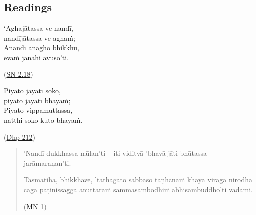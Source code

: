 \documentclass[11pt,oneside]{memoir}
\begin{document}
\normalArrayStretch

\clearpage
\subsection{Readings}
\label{sec:org4e81f1f}

\begin{twocols}
`Aghajātassa ve nandī, \\
nandījātassa ve aghaṁ; \\
Anandī anagho bhikkhu, \\
evaṁ jānāhi āvuso'ti.

(\href{https://suttacentral.net/sn2.18/pli/ms}{SN 2.18})

\columnbreak

Piyato jāyatī soko, \\
piyato jāyatī bhayaṁ; \\
Piyato vippamuttassa, \\
natthi soko kuto bhayaṁ.

(\href{https://suttacentral.net/dhp209-220/pli/ms}{Dhp 212})
\end{twocols}

\begin{quote}
\raggedright

'Nandī dukkhassa mūlan'ti -- iti viditvā 'bhavā jāti bhūtassa jarāmaraṇan'ti.

Tasmātiha, bhikkhave, 'tathāgato sabbaso taṇhānaṁ khayā virāgā nirodhā cāgā paṭinissaggā anuttaraṁ sammāsambodhiṁ abhisambuddho'ti vadāmi.

(\href{https://suttacentral.net/mn1/pli/ms}{MN 1})
\end{quote}

\bigskip
\end{document}
